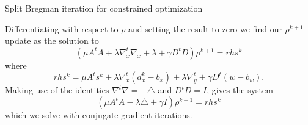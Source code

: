 \documentclass[xcolor=dvipsnames]{beamer}
\theoremstyle{remark}
\begin{document}
\begin{frame}
\begin{algorithm}[H]
\caption{Split Bregman iteration for constrained optimization}
\label{sbalgo}


\end{algorithm}
\end{frame}

\begin{frame}
Differentiating with respect to $\rho$ and setting the result to zero we find our $\rho^{k+1}$ update as the solution to
\begin{equation}
(\mu A^tA + \lambda \nabla_x^t \nabla_x + \lambda + \gamma D^tD )\rho^{k+1} = rhs^k
\end{equation}
where
\begin{equation}
rhs^k = \mu A^t s^k + \lambda \nabla_x ^t (d_x^k - b_x) + \lambda \nabla_y^t + \gamma D^t(w - b_w).
\end{equation}
Making use of the identities $\nabla^t \nabla = - \triangle$ and $D^tD = I$, gives the system
\begin{equation}\label{hybridsys}
(\mu A^tA - \lambda \triangle + \gamma I )\rho^{k+1} = rhs^k
\end{equation}
which we solve with conjugate gradient iterations.

\end{frame}
\end{document}
